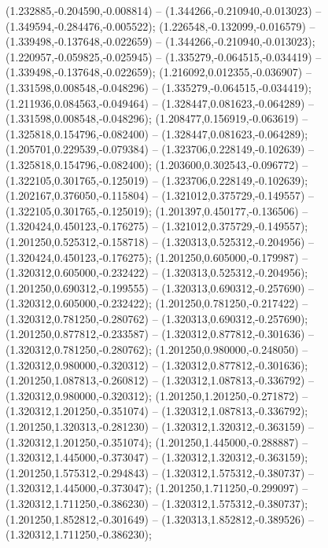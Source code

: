  (1.232885,-0.204590,-0.008814) -- (1.344266,-0.210940,-0.013023) -- (1.349594,-0.284476,-0.005522);
 (1.226548,-0.132099,-0.016579) -- (1.339498,-0.137648,-0.022659) -- (1.344266,-0.210940,-0.013023);
 (1.220957,-0.059825,-0.025945) -- (1.335279,-0.064515,-0.034419) -- (1.339498,-0.137648,-0.022659);
 (1.216092,0.012355,-0.036907) -- (1.331598,0.008548,-0.048296) -- (1.335279,-0.064515,-0.034419);
 (1.211936,0.084563,-0.049464) -- (1.328447,0.081623,-0.064289) -- (1.331598,0.008548,-0.048296);
 (1.208477,0.156919,-0.063619) -- (1.325818,0.154796,-0.082400) -- (1.328447,0.081623,-0.064289);
 (1.205701,0.229539,-0.079384) -- (1.323706,0.228149,-0.102639) -- (1.325818,0.154796,-0.082400);
 (1.203600,0.302543,-0.096772) -- (1.322105,0.301765,-0.125019) -- (1.323706,0.228149,-0.102639);
 (1.202167,0.376050,-0.115804) -- (1.321012,0.375729,-0.149557) -- (1.322105,0.301765,-0.125019);
 (1.201397,0.450177,-0.136506) -- (1.320424,0.450123,-0.176275) -- (1.321012,0.375729,-0.149557);
 (1.201250,0.525312,-0.158718) -- (1.320313,0.525312,-0.204956) -- (1.320424,0.450123,-0.176275);
 (1.201250,0.605000,-0.179987) -- (1.320312,0.605000,-0.232422) -- (1.320313,0.525312,-0.204956);
 (1.201250,0.690312,-0.199555) -- (1.320313,0.690312,-0.257690) -- (1.320312,0.605000,-0.232422);
 (1.201250,0.781250,-0.217422) -- (1.320312,0.781250,-0.280762) -- (1.320313,0.690312,-0.257690);
 (1.201250,0.877812,-0.233587) -- (1.320312,0.877812,-0.301636) -- (1.320312,0.781250,-0.280762);
 (1.201250,0.980000,-0.248050) -- (1.320312,0.980000,-0.320312) -- (1.320312,0.877812,-0.301636);
 (1.201250,1.087813,-0.260812) -- (1.320312,1.087813,-0.336792) -- (1.320312,0.980000,-0.320312);
 (1.201250,1.201250,-0.271872) -- (1.320312,1.201250,-0.351074) -- (1.320312,1.087813,-0.336792);
 (1.201250,1.320313,-0.281230) -- (1.320312,1.320312,-0.363159) -- (1.320312,1.201250,-0.351074);
 (1.201250,1.445000,-0.288887) -- (1.320312,1.445000,-0.373047) -- (1.320312,1.320312,-0.363159);
 (1.201250,1.575312,-0.294843) -- (1.320312,1.575312,-0.380737) -- (1.320312,1.445000,-0.373047);
 (1.201250,1.711250,-0.299097) -- (1.320312,1.711250,-0.386230) -- (1.320312,1.575312,-0.380737);
 (1.201250,1.852812,-0.301649) -- (1.320313,1.852812,-0.389526) -- (1.320312,1.711250,-0.386230);
